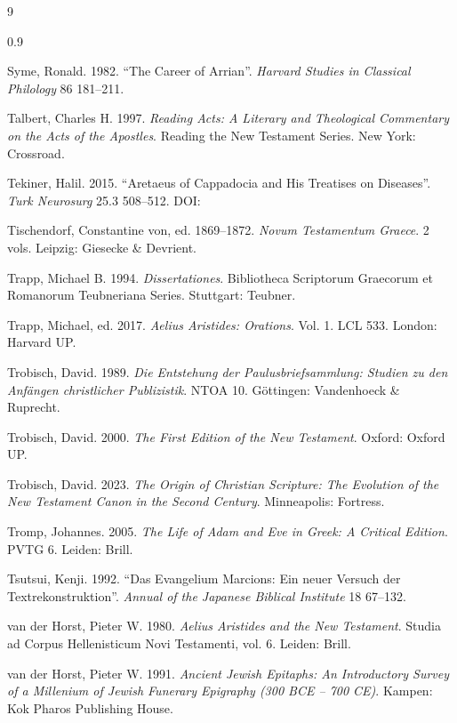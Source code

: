 \begin{thebibliography}{9}
\begin{spacing}{0.9}
\begin{small}
Syme, Ronald. 1982. %
“The Career of Arrian”. %
\textit{Harvard Studies in Classical Philology} 86 181--211. %

Talbert, Charles H. 1997. %
\textit{Reading Acts: %
A Literary and Theological Commentary on the Acts of the Apostles}. %
Reading the New Testament Series. New York: Crossroad. %

Tekiner, Halil. 2015. %
“Aretaeus of Cappadocia and His Treatises on Diseases”. %
\textit{Turk Neurosurg} 25.3 508--512. %
DOI: 

Tischendorf, Constantine von, ed. 1869--1872. %
\textit{Novum Testamentum Graece}. 2 vols. %
Leipzig: Giesecke \& Devrient. %

Trapp, Michael B. 1994. %
\textit{Dissertationes}. %
Bibliotheca Scriptorum Graecorum et Romanorum Teubneriana Series. %
Stuttgart: Teubner. %

Trapp, Michael, ed. 2017. %
\textit{Aelius Aristides: Orations}. Vol. 1. 
LCL 533. %
London: Harvard UP. %

Trobisch, David. 1989. %
\textit{Die Entstehung der Paulusbriefsammlung: Studien zu den Anfängen christlicher Publizistik}. %
NTOA 10. Göttingen: Vandenhoeck \& Ruprecht. %

Trobisch, David. 2000. %
\textit{The First Edition of the New Testament}. %
Oxford: Oxford UP. 

Trobisch, David. 2023. %
\textit{The Origin of Christian Scripture: %
The Evolution of the New Testament Canon in the Second Century}. %
Minneapolis: Fortress. %

Tromp, Johannes. 2005. %
\textit{The Life of Adam and Eve in Greek: A Critical Edition}. %
PVTG 6. Leiden: Brill. %

Tsutsui, Kenji. 1992. %
“Das Evangelium Marcions: Ein neuer Versuch der Textrekonstruktion”. %
\textit{Annual of the Japanese Biblical Institute} 18 67–132. %

van der Horst, Pieter W. 1980. %
\textit{Aelius Aristides and the New Testament}. %
Studia ad Corpus Hellenisticum Novi Testamenti, vol. 6. %
Leiden: Brill. %

van der Horst, Pieter W. 1991. %
\textit{Ancient Jewish Epitaphs: An Introductory Survey of a Millenium of Jewish Funerary Epigraphy (300 BCE -- 700 CE)}. %
Kampen: Kok Pharos Publishing House. %


\end{small}
\end{spacing}
\end{thebibliography}
